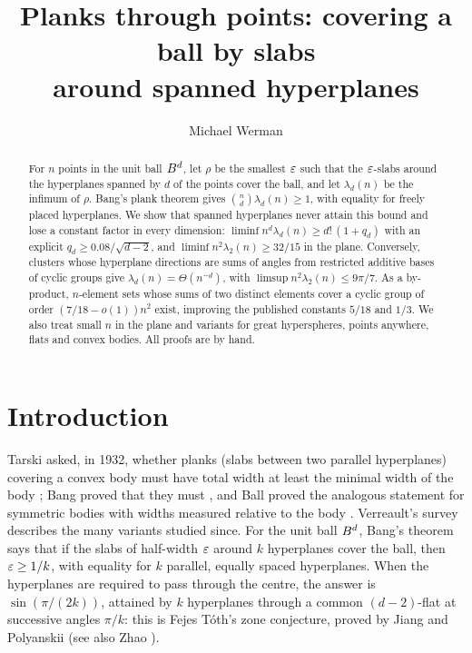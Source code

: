 \documentclass[11pt]{article}
\title{Planks through points: covering a ball by slabs\\ around spanned hyperplanes}
\author{Michael Werman}
\date{}
\begin{document}
\maketitle

\begin{abstract}
For $n$ points in the unit ball $B^d$, let $\rho$ be the smallest $\varepsilon$ such that the $\varepsilon$-slabs around the
hyperplanes spanned by $d$ of the points cover the ball, and let $\lambda_d(n)$ be the infimum of $\rho$. Bang's
plank theorem gives $\binom nd\lambda_d(n)\ge1$, with equality for freely placed hyperplanes. We show that spanned
hyperplanes never attain this bound and lose a constant factor in every dimension:
$\liminf n^d\lambda_d(n)\ge d!\,(1+q_d)$ with an explicit $q_d\ge0.08/\sqrt{d-2}$, and
$\liminf n^2\lambda_2(n)\ge32/15$ in the plane. Conversely, clusters whose hyperplane directions
are sums of angles from restricted additive bases of cyclic groups give $\lambda_d(n)=\Theta(n^{-d})$, with
$\limsup n^2\lambda_2(n)\le9\pi/7$. As a by-product, $n$-element sets whose sums of two distinct elements cover a
cyclic group of order $(7/18-o(1))n^2$ exist, improving the published constants $5/18$ and $1/3$. We also treat
small $n$ in the plane and variants for great hyperspheres, points anywhere, flats and convex bodies. All proofs are
by hand.
\end{abstract}

\section{Introduction}\label{sec:intro}

Tarski asked, in 1932, whether planks (slabs between two parallel hyperplanes) covering a convex body must
have total width at least the minimal width of the body \cite{Tarski}; Bang proved that they must \cite{Bang},
and Ball proved the analogous statement for symmetric bodies with widths measured relative to the body
\cite{Ball}. Verreault's survey \cite{Verreault} describes the many variants studied since. For the unit ball
$B^d$, Bang's theorem says that if the slabs of half-width $\varepsilon$ around $k$ hyperplanes cover the ball, then
$\varepsilon\ge1/k$, with equality for $k$ parallel, equally spaced hyperplanes. When the hyperplanes are required to pass
through the centre, the answer is $\sin(\pi/(2k))$, attained by $k$ hyperplanes through a common $(d-2)$-flat at successive angles
$\pi/k$: this is Fejes T\'oth's zone conjecture, proved by Jiang and Polyanskii \cite{JP} (see also
Zhao \cite{Zhao}).
\end{document}
